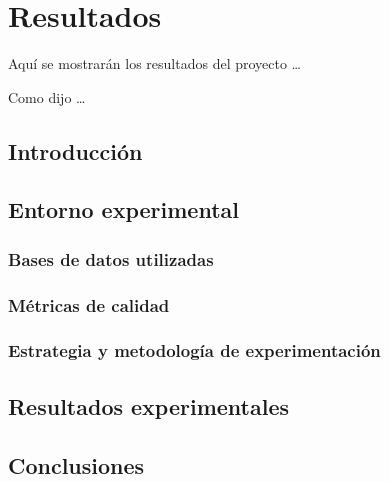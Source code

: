 
\chapter{Resultados}
\label{cha:resultados}

Aquí se mostrarán los resultados del proyecto \ldots

Como dijo \cite{einstein} \ldots

\section{Introducción}
\label{sec:intro-resultados}

\section{Entorno experimental}
\label{sec:desarrollo-resultados}

\subsection{Bases de datos utilizadas}
\label{subsec:bases-datos}

\subsection{Métricas de calidad}
\label{subsec:metricas-calidad}

\subsection{Estrategia y metodología de experimentación}
\label{subsec:estrategia-metodologia}

\section{Resultados experimentales}
\label{sec:resultados-experimentales}

\section{Conclusiones}
\label{sec:conclu-resultados}
